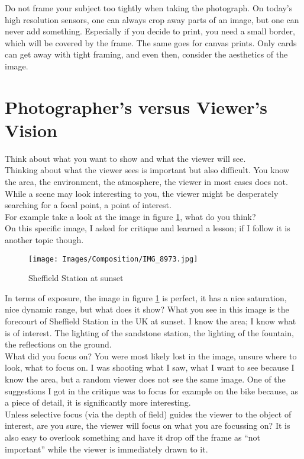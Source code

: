 Do not frame your subject too tightly when taking the photograph. On today's high resolution sensors, one can always crop away parts of an image, but one can never add something. Especially if you decide to print, you need a small border, which will be covered by the frame. The same goes for canvas prints. Only cards can get away with tight framing, and even then, consider the aesthetics of the image.

\section{Photographer's versus Viewer's Vision}

Think about what you want to show and what the viewer will see.
\\
Thinking about what the viewer sees is important but also difficult. You know the area, the environment, the atmosphere, the viewer in most cases does not. While a scene may look interesting to you, the viewer might be desperately searching for a focal point, a point of interest.
\\[\baselineskip]
For example take a look at the image in figure \ref{fig:IMG_8973}, what do you think?
\\
On this specific image, I asked for critique and learned a lesson; if I follow it is another topic though.

\begin{figure}[htb]
	\centering
		\texttt{[image: Images/Composition/IMG\_8973.jpg]}
	\caption{Sheffield Station at sunset}
	\label{fig:IMG_8973}
\end{figure}

In terms of exposure, the image in figure \ref{fig:IMG_8973} is perfect, it has a nice saturation, nice dynamic range, but what does it show? What you see in this image is the forecourt of Sheffield Station in the UK at sunset. I know the area; I know what is of interest. The lighting of the sandstone station, the lighting of the fountain, the reflections on the ground.
\\
What did you focus on? You were most likely lost in the image, unsure where to look, what to focus on. I was shooting what I saw, what I want to see because I know the area, but a random viewer does not see the same image. One of the suggestions I got in the critique was to focus for example on the bike because, as a piece of detail, it is significantly more interesting.
\\[\baselineskip]
Unless selective focus (via the depth of field) guides the viewer to the object of interest, are you sure, the viewer will focus on what you are focussing on? It is also easy to overlook something and have it drop off the frame as ``not important'' while the viewer is immediately drawn to it.

